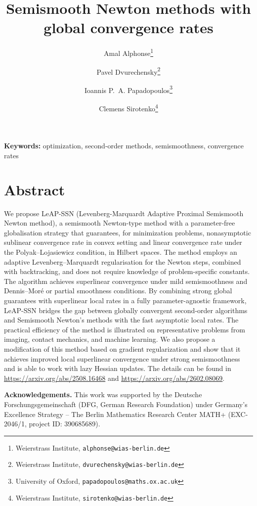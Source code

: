 \documentclass[11pt]{article}
\title{\bfseries Semismooth Newton methods with global convergence rates}
\author{
Amal Alphonse\thanks{Weierstrass Institute,
\texttt{alphonse@wias-berlin.de}}
\and
Pavel Dvurechensky\thanks{Weierstrass Institute,
\texttt{dvurechensky@wias-berlin.de}}
\and
Ioannis P.~A. Papadopoulos\thanks{University of Oxford,
\texttt{papadopoulos@maths.ox.ac.uk}}
\and
Clemens Sirotenko\thanks{Weierstrass Institute,
\texttt{sirotenko@wias-berlin.de}}
}
\date{}
\begin{document}
\maketitle

\vspace{-1em}

\noindent
\textbf{Keywords:}
optimization, second-order methods, semismoothness, convergence rates

\vspace{0.5em}


\vspace{1em}

\section*{Abstract}

We propose LeAP-SSN (Levenberg-Marquardt Adaptive Proximal Semismooth Newton method), a semismooth Newton-type method with a parameter-free globalisation strategy that guarantees, for minimization problems, nonasymptotic sublinear convergence rate in convex setting and linear convergence rate under the Polyak--Lojasiewicz condition, in Hilbert spaces. The method employs an adaptive Levenberg--Marquardt regularisation for the Newton steps, combined with backtracking, and does not require knowledge of problem-specific constants. The algorithm achieves superlinear convergence under mild semismoothness and Dennis--Moré or partial smoothness conditions. By combining strong global guarantees with superlinear local rates in a fully parameter-agnostic framework, LeAP-SSN bridges the gap between globally convergent second-order algorithms and Semismooth Newton's methods with the fast asymptotic local rates. The practical efficiency of the method is illustrated on representative problems from imaging, contact mechanics, and machine learning. We also propose a modification of this method based on gradient regularization and show that it achieves improved local superlinear convergence under strong semismoothness and is able to work with lazy Hessian updates. The details can be found in \url{https://arxiv.org/abs/2508.16468} and \url{https://arxiv.org/abs/2602.08069}.

\vspace{1em}

\noindent
\textbf{Acknowledgements.}
This work was supported by the Deutsche Forschungsgemeinschaft (DFG, German Research Foundation) under Germany's Excellence Strategy -- The Berlin Mathematics Research Center MATH+ (EXC-2046/1, project ID: 390685689).

\vspace{1em}

%
%
%
\end{document}

